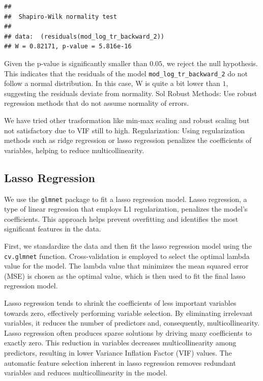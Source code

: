 \documentclass[
]{article}
\begin{document}
\begin{verbatim}
## 
##  Shapiro-Wilk normality test
## 
## data:  (residuals(mod_log_tr_backward_2))
## W = 0.82171, p-value = 5.816e-16
\end{verbatim}

Given the p-value is significantly smaller than \(0.05\), we reject the
null hypothesis. This indicates that the residuals of the model
\texttt{mod\_log\_tr\_backward\_2} do not follow a normal distribution.
In this case, W is quite a bit lower than \(1\), suggesting the
residuals deviate from normality. Sol Robust Methods: Use robust
regression methods that do not assume normality of errors.

We have tried other trasformation like min-max scaling and robust
scaling but not satisfactory due to VIF still to high. Regularization:
Using regularization methods such as ridge regression or lasso
regression penalizes the coefficients of variables, helping to reduce
multicollinearity.

\subsection{Lasso Regression}\label{lasso-regression}

We use the \texttt{glmnet} package to fit a lasso regression model.
Lasso regression, a type of linear regression that employs L1
regularization, penalizes the model's coefficients. This approach helps
prevent overfitting and identifies the most significant features in the
data.

First, we standardize the data and then fit the lasso regression model
using the \texttt{cv.glmnet} function. Cross-validation is employed to
select the optimal lambda value for the model. The lambda value that
minimizes the mean squared error (MSE) is chosen as the optimal value,
which is then used to fit the final lasso regression model.

Lasso regression tends to shrink the coefficients of less important
variables towards zero, effectively performing variable selection. By
eliminating irrelevant variables, it reduces the number of predictors
and, consequently, multicollinearity. Lasso regression often produces
sparse solutions by driving many coefficients to exactly zero. This
reduction in variables decreases multicollinearity among predictors,
resulting in lower Variance Inflation Factor (VIF) values. The automatic
feature selection inherent in lasso regression removes redundant
variables and reduces multicollinearity in the model.
\end{document}
